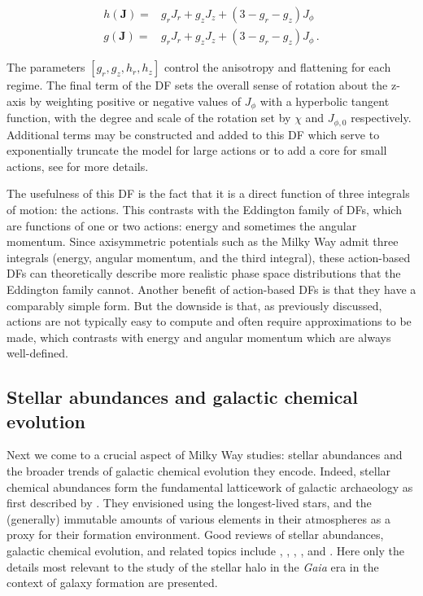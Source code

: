 \begin{equation}
\label{ch1:eq:action-df-flattening-anisotropy}
\begin{split}
    h(\mathbf{J}) = & g_{r} J_{r} + g_{z} J_{z} + (3-g_{r}-g_{z}) J_{\phi} \\
    g(\mathbf{J}) = & g_{r} J_{r} + g_{z} J_{z} + (3-g_{r}-g_{z}) J_{\phi}\,.
\end{split}
\end{equation}

\noindent The parameters $[g_{r}, g_{z}, h_{r}, h_{z}]$ control the anisotropy and flattening for each regime. The final term of the DF sets the overall sense of rotation about the z-axis by weighting positive or negative values of $J_{\phi}$ with a hyperbolic tangent function, with the degree and scale of the rotation set by $\chi$ and $J_{\phi,0}$ respectively. Additional terms may be constructed and added to this DF which serve to exponentially truncate the model for large actions or to add a core for small actions, see \textcite{binney14d} for more details.

The usefulness of this DF is the fact that it is a direct function of three integrals of motion: the actions. This contrasts with the Eddington family of DFs, which are functions of one or two actions: energy and sometimes the angular momentum. Since axisymmetric potentials such as the Milky Way admit three integrals (energy, angular momentum, and the third integral), these action-based DFs can theoretically describe more realistic phase space distributions that the Eddington family cannot. Another benefit of action-based DFs is that they have a comparably simple form. But the downside is that, as previously discussed, actions are not typically easy to compute and often require approximations to be made, which contrasts with energy and angular momentum which are always well-defined.

\subsection{Stellar abundances and galactic chemical evolution}

Next we come to a crucial aspect of Milky Way studies: stellar abundances and the broader trends of galactic chemical evolution they encode. Indeed, stellar chemical abundances form the fundamental latticework of galactic archaeology as first described by \textcite{freeman02}. They envisioned using the longest-lived stars, and the (generally) immutable amounts of various elements in their atmospheres as a proxy for their formation environment. Good reviews of stellar abundances, galactic chemical evolution, and related topics include  \textcite{tolstoy09}, \textcite{asplund09}, \textcite{nomoto13}, \textcite{frebel15}, and \textcite{kobayashi23}. Here only the details most relevant to the study of the stellar halo in the \textit{Gaia} era in the context of galaxy formation are presented.

